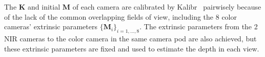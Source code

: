 The $\mathbf{K}$ and initial $\mathbf{M}$ of each camera are calibrated by Kalibr~\cite{Maye2013Self} pairwisely because of the lack of the common overlapping fields of view, including the 8 color cameras' extrinsic parameters $\{\mathbf{M}_{i}\}_{i=1,\ldots,8}$. The extrinsic parameters from the 2 NIR cameras to the color camera in the same camera pod are also achieved, but these extrinsic parameters are fixed and used to estimate the depth in each view.





